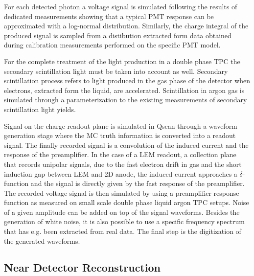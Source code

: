 For each detected photon a voltage signal is simulated following the results of dedicated 
measurements showing that a typical PMT response can be approximated with a log-normal distribution.
Similarly, the charge integral of the produced signal is sampled from a distibution extracted form data obtained during calibration measurements
performed on the specific PMT model.

For the complete treatment of the light production in a double phase TPC
the secondary scintillation light must be taken into account as well.
Secondary scintillation process refers to light produced in the gas phase of the detector when electrons, extracted form the liquid, are accelerated.
Scintillation in argon gas is simulated through a parameterization to the existing measurements of secondary scintillation light yields.

Signal on the charge readout plane is simulated in Qscan through a waveform generation stage where the MC truth information
is converted into a readout signal. 
The finally recorded signal  is a convolution of the induced current and the response of the preamplifier.
In the case of a LEM readout, 
a collection plane that records unipolar signals,  due to the fast electron drift in gas and the short induction gap between LEM and 2D anode, 
the induced current approaches a $\delta$-function and the signal is directly given by the fast response of the preamplifier.
The recorded voltage signal is then simulated by using a preamplifier response function
as measured on small scale double phase liquid argon TPC setups. 
Noise of a given amplitude can be added on top of the signal waveforms.
Besides the generation of white noise, it is also possible to use a specific frequency spectrum that has e.g. been extracted from real data. 
The final step is the digitization of the generated waveforms.



\subsection{Near Detector Reconstruction}
\label{sec:detectors-sc-physics-software-reconstruction-nd}

